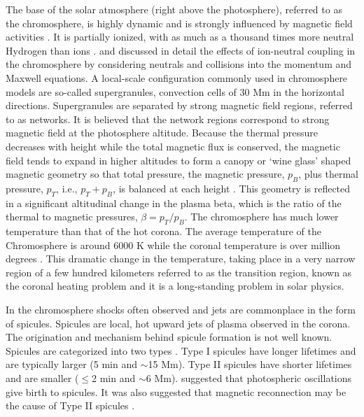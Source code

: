 \documentclass[12pt,upcase]{umlthesis}
\begin{document}
The base of the solar atmosphere (right above the photosphere), referred to as the chromosphere, is highly dynamic and is strongly influenced by magnetic field activities \citep{Hasan08}. It is partially ionized, with as much as a thousand times more neutral Hydrogen than ions \citep{Alissandrakis2018}. \citet{Song2011} and \citet{Leake2014} discussed in detail the effects of ion-neutral coupling in  the chromosphere by considering neutrals and collisions into the momentum and Maxwell equations. A local-scale configuration commonly used in chromosphere models are so-called supergranules, convection cells of 30 Mm in the horizontal directions. Supergranules are separated by strong magnetic field regions, referred to as networks. It is believed that the network regions correspond to strong magnetic field at the photosphere altitude. Because the thermal pressure decreases with height while the total magnetic flux is conserved, the magnetic field tends to expand in higher altitudes to form a canopy or `wine glass' shaped magnetic geometry so that total pressure, the  magnetic pressure, $p_B$, plus thermal pressure, $p_T$, i.e., $p_T+p_B$, is balanced at each height \citep{gabriel1976}. This geometry is reflected in a significant altitudinal change in the plasma beta, which is the ratio of the thermal to magnetic pressures, $\beta=p_T/p_B$. The chromosphere has much lower temperature than that of the hot corona. The average temperature of the Chromosphere is around 6000 K while the coronal temperature is over million degrees \citep{AvrettLoeser2008}. This dramatic change in the temperature, taking place in a very narrow region of a few hundred kilometers referred to as the transition region, known as the coronal heating problem and it is a long-standing problem in solar physics.

In the chromosphere shocks often observed and jets are commonplace in the form of spicules. Spicules are local, hot upward jets of plasma observed in the corona. The origination and mechanism behind spicule formation is not well known. Spicules are categorized into two types \citep{Pontieu2007}. Type I spicules have longer lifetimes and are typically larger (5 min and $\sim$15 Mm). Type II spicules have shorter lifetimes and are smaller ($\leq$2 min and $\sim$6 Mm). \citet{Pontieu2004} suggested that photospheric oscillations give birth to spicules. It was also suggested that magnetic reconnection may be the cause of Type II spicules \citep{Pontieu2007}.
\end{document}
